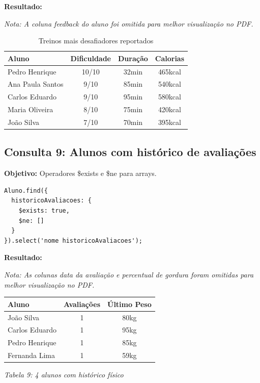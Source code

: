 \documentclass[12pt,a4paper]{article}
\begin{document}
\textbf{Resultado:}

\textit{Nota: A coluna feedback do aluno foi omitida para melhor visualização no PDF.}

\begin{table}[h]
\centering
\small
\begin{tabular}{lccc}
\toprule
Aluno & Dificuldade & Duração & Calorias \\
\midrule
Pedro Henrique & 10/10 & 32min & 465kcal \\
Ana Paula Santos & 9/10 & 85min & 540kcal \\
Carlos Eduardo & 9/10 & 95min & 580kcal \\
Maria Oliveira & 8/10 & 75min & 420kcal \\
João Silva & 7/10 & 70min & 395kcal \\
\bottomrule
\end{tabular}
\caption{Treinos mais desafiadores reportados}
\end{table}

\subsection{Consulta 9: Alunos com histórico de avaliações}

\textbf{Objetivo:} Operadores \$exists e \$ne para arrays.

\begin{lstlisting}[caption=Query 9 - Validação de Arrays]
Aluno.find({
  historicoAvaliacoes: { 
    $exists: true, 
    $ne: [] 
  }
}).select('nome historicoAvaliacoes');
\end{lstlisting}

\textbf{Resultado:}

\textit{Nota: As colunas data da avaliação e percentual de gordura foram omitidas para melhor visualização no PDF.}

\begin{center}
\small
\begin{tabular}{lcc}
\toprule
Aluno & Avaliações & Último Peso \\
\midrule
João Silva & 1 & 80kg \\
Carlos Eduardo & 1 & 95kg \\
Pedro Henrique & 1 & 85kg \\
Fernanda Lima & 1 & 59kg \\
\bottomrule
\end{tabular}

\textit{Tabela 9: 4 alunos com histórico físico}
\end{center}
\end{document}
